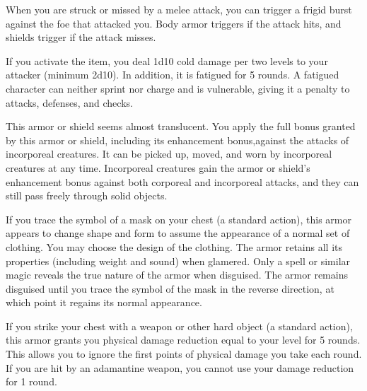 
 When you are struck or missed by a melee attack, you can trigger a frigid burst against the foe that attacked you. Body armor triggers if the attack hits, and shields trigger if the attack misses.

If you activate the item, you deal 1d10 cold damage per two levels to your attacker (minimum 2d10). In addition, it is fatigued for 5 rounds. A fatigued character can neither sprint nor charge and is vulnerable, giving it a  penalty to attacks, defenses, and checks.


 This armor or shield seems almost translucent. You apply the full bonus granted by this armor or shield, including its enhancement bonus,against the attacks of incorporeal creatures. It can be picked up, moved, and worn by incorporeal creatures at any time. Incorporeal creatures gain the armor or shield's enhancement bonus against both corporeal and incorporeal attacks, and they can still pass freely through solid objects.


 If you trace the symbol of a mask on your chest (a standard action), this armor appears to change shape and form to assume the appearance of a normal set of clothing. You may choose the design of the clothing. The armor retains all its properties (including weight and sound) when glamered. Only a  spell or similar magic reveals the true nature of the armor when disguised. The armor remains disguised until you trace the symbol of the mask in the reverse direction, at which point it regains its normal appearance. 


 If you strike your chest with a weapon or other hard object (a standard action), this armor grants you physical damage reduction equal to your level for 5 rounds. This allows you to ignore the first points of physical damage you take each round. If you are hit by an adamantine weapon, you cannot use your damage reduction for 1 round.

